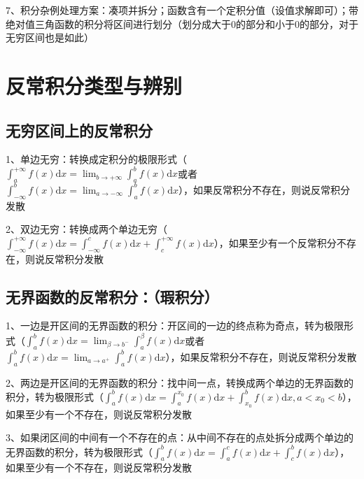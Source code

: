 7、积分杂例处理方案：凑项并拆分；函数含有一个定积分值（设值求解即可）；带绝对值三角函数的积分将区间进行划分（划分成大于0的部分和小于0的部分，对于无穷区间也是如此）

\section{反常积分类型与辨别}



\subsection{无穷区间上的反常积分}

1、单边无穷：转换成定积分的极限形式（$\int_{a}^{+\infty} f(x) \mathrm{d} x=\lim _{b \rightarrow+\infty} \int_{a}^{b} f(x) \mathrm{d} x$或者$\int_{-\infty}^{b} f(x) \mathrm{d} x=\lim _{a \rightarrow-\infty} \int_{a}^{b} f(x) \mathrm{d} x$），如果反常积分不存在，则说反常积分发散

2、双边无穷：转换成两个单边无穷（$\int_{-\infty}^{+\infty} f(x) \mathrm{d} x=\int_{-\infty}^{c} f(x) \mathrm{d} x+\int_{c}^{+\infty} f(x) \mathrm{d} x$），如果至少有一个反常积分不存在，则说反常积分发散



\subsection{无界函数的反常积分：（瑕积分）}

1、一边是开区间的无界函数的积分：开区间的一边的终点称为奇点，转为极限形式（$\int_{a}^{b} f(x) \mathrm{d} x=\lim _{\beta \rightarrow b^{-}} \int_{a}^{\beta} f(x) \mathrm{d} x$或者$\int_{a}^{b} f(x) \mathrm{d} x=\lim _{a \rightarrow a^{+}} \int_{a}^{b} f(x) \mathrm{d} x$），如果反常积分不存在，则说反常积分发散

2、两边是开区间的无界函数的积分：找中间一点，转换成两个单边的无界函数的积分，转为极限形式（$\int_{a}^{b} f(x) \mathrm{d} x=\int_{a}^{x_{0}} f(x) \mathrm{d} x+\int_{x_{0}}^{b} f(x) \mathrm{d} x, a<x_{0}<b$），如果至少有一个不存在，则说反常积分发散

3、如果闭区间的中间有一个不存在的点：从中间不存在的点处拆分成两个单边的无界函数的积分，转为极限形式（$\int_{a}^{b} f(x) \mathrm{d} x=\int_{a}^{c} f(x) \mathrm{d} x+\int_{c}^{b} f(x) \mathrm{d} x$），如果至少有一个不存在，则说反常积分发散



